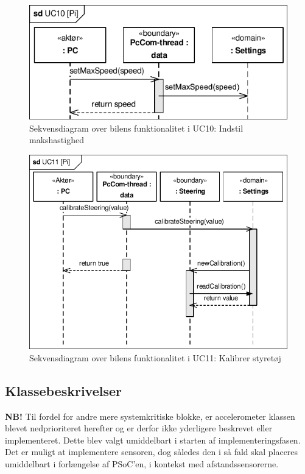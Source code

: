 \begin{figure}[h]
\centering
\includegraphics[]{../fig/diagrammer/bil/sd_uc10.pdf}
\caption{Sekvensdiagram over  bilens funktionalitet i UC10: Indstil makshastighed}
\label{fig:sd_uc10_bil}
\end{figure}

\begin{figure}[h]
\centering
\includegraphics[]{../fig/diagrammer/bil/sd_uc11.pdf}
\caption{Sekvensdiagram over  bilens funktionalitet i UC11: Kalibrer styretøj}
\label{fig:sd_uc11_bil}
\end{figure}

\clearpage
\subsection{Klassebeskrivelser}

\clearpage

\clearpage

\clearpage

\clearpage

\clearpage

\clearpage


\textbf{NB!}
Til fordel for andre mere systemkritiske blokke, er accelerometer klassen blevet nedprioriteret herefter og er derfor ikke yderligere beskrevet eller implementeret. Dette blev valgt umiddelbart i starten af implementeringsfasen. Det er muligt at implementere sensoren, dog således den i så fald skal placeres umiddelbart i forlængelse af PSoC'en, i kontekst med afstandssensorerne.